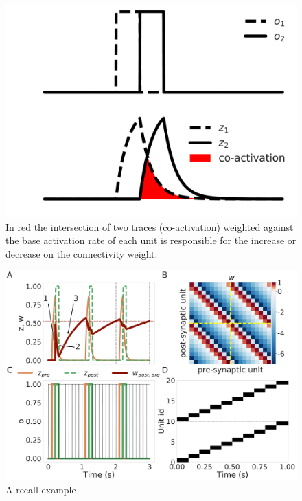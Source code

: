\documentclass[10pt,a4paper]{article}
\begin{document}
\begin{figure}[H]
\centering
\includegraphics[scale=0.30]{traces_example.pdf}
\caption{In red the intersection of two traces (co-activation) weighted against the base activation rate of each unit is responsible for the increase or decrease on the connectivity weight.}
\label{fig:traces_example}
\end{figure}

\begin{figure}[H]
\centering
\includegraphics[scale=0.15]{recall_example.pdf}
\caption{A recall example}
\label{fig:recall_example}
\end{figure}
\end{document}

